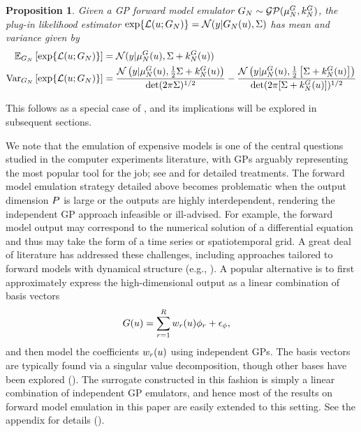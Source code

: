 \documentclass[12pt]{article}
\newtheorem{prop}{Proposition}
\begin{document}
\begin{prop} \label{fwd_em_lik_emulator_moments_Gaussian}
Given a GP forward model emulator $\fwdEm[\Ndesign] \sim \GP(\emMean[\Ndesign]{\fwd}, \emKer[\Ndesign]{\fwd})$, 
the plug-in likelihood estimator $\Exp{\llik(\Par; \fwdEm)} = \Gaussian(\obs| \fwdEm[\Ndesign](\Par), \likPar)$ has 
mean and variance given by 
\begin{align}
\E_{\fwdEm}\left[\Exp{\llik(\Par; \fwdEm)} \right] 
&= \Gaussian(\obs | \emMean[\Ndesign]{\fwd}(\Par), \likPar + \emKer[\Ndesign]{\fwd}(\Par)) \\
\Var_{\fwdEm}\left[\Exp{\llik(\Par; \fwdEm)} \right]
&= \frac{\Gaussian\left(\obs | \emMean[\Ndesign]{\fwd}(\Par), \frac{1}{2}\likPar + \emKer[\Ndesign]{\fwd}(\Par)  \right)}{\det(2\pi \likPar)^{1/2}}
- \frac{\Gaussian\left(\obs | \emMean[\Ndesign]{\fwd}(\Par), \frac{1}{2}\left[\likPar + \emKer[\Ndesign]{\fwd}(\Par)\right]  \right)}{\det(2\pi [\likPar + \emKer[\Ndesign]{\fwd}(\Par)])^{1/2}}
\end{align}
\end{prop}
This follows as a special case of , and its implications will be explored in subsequent sections. 

We note that the emulation of expensive models is one of the central questions studied in the 
computer experiments literature, with GPs arguably representing the most popular tool 
for the job; see \cite{gramacy2020surrogates} and 
\cite{design_analysis_computer_experiments} for detailed treatments.
The forward model emulation strategy detailed above becomes problematic when the output 
dimension $\dimObs$ is large or the outputs are highly interdependent, rendering the independent GP 
approach infeasible or ill-advised.
For example, the forward model output may correspond to the numerical solution of 
a differential equation and thus may take the form of a time series or spatiotemporal grid. 
A great deal of literature has addressed these challenges, including approaches tailored to forward models
with dynamical structure 
(e.g., \cite{GP_dynamic_emulation, Bayesian_emulation_dynamic, Liu_West_dynamic_emulation, dynamic_nonlinear_simulators_GP}).
A popular alternative is to first approximately express the high-dimensional output as a linear combination of basis vectors 
\begin{align}
\fwd(\Par) &= \sum_{\idxBasis=1}^{\dimBasis} \basisWeight_{\idxBasis}(\Par) \basisVec_{\idxBasis} + \noise_{\basisVec},
\end{align}
and then model the coefficients $\basisWeight_{\idxBasis}(\Par)$ using independent GPs. The basis vectors 
are typically found via a singular value decomposition, though other bases have been explored 
(\cite{HigdonBasis, emulate_functional_output, functionValuedModels, PODemulation}). The surrogate constructed in 
this fashion is simply a linear combination of independent GP emulators, and hence most of the results on forward model 
emulation in this paper are easily extended to this setting. See the appendix for details (\todo). 
\end{document}
